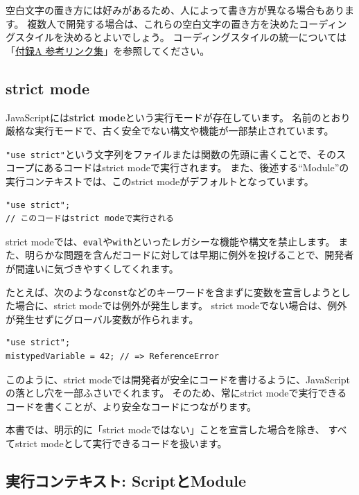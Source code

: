 空白文字の置き方には好みがあるため、人によって書き方が異なる場合もあります。
複数人で開発する場合は、これらの空白文字の置き方を決めたコーディングスタイルを決めるとよいでしょう。
コーディングスタイルの統一については「\hyperlink{reference-links}{付録A 参考リンク集}」を参照してください。

\hypertarget{strict-mode}{%
\subsection{strict mode}\label{strict-mode}}

JavaScriptには\textbf{strict mode}という実行モードが存在しています。
名前のとおり厳格な実行モードで、古く安全でない構文や機能が一部禁止されています。

\texttt{"use strict"}という文字列をファイルまたは関数の先頭に書くことで、そのスコープにあるコードはstrict
modeで実行されます。
また、後述する``Module''の実行コンテキストでは、このstrict
modeがデフォルトとなっています。\enlargethispage{\baselineskip}

\begin{lstlisting}
"use strict";
// このコードはstrict modeで実行される
\end{lstlisting}

strict
modeでは、\texttt{eval}や\texttt{with}といったレガシーな機能や構文を禁止します。
また、明らかな問題を含んだコードに対しては早期に例外を投げることで、開発者が間違いに気づきやすくしてくれます。

たとえば、次のような\texttt{const}などのキーワードを含まずに変数を宣言しようとした場合に、strict
modeでは例外が発生します。 strict
modeでない場合は、例外が発生せずにグローバル変数が作られます。

\begin{lstlisting}
"use strict";
mistypedVariable = 42; // => ReferenceError
\end{lstlisting}

このように、strict
modeでは開発者が安全にコードを書けるように、JavaScriptの落とし穴を一部ふさいでくれます。
そのため、常にstrict
modeで実行できるコードを書くことが、より安全なコードにつながります。

本書では、明示的に「strict modeではない」ことを宣言した場合を除き、
すべてstrict modeとして実行できるコードを扱います。

\hypertarget{script-module}{%
\subsection{実行コンテキスト: ScriptとModule}\label{script-module}}

